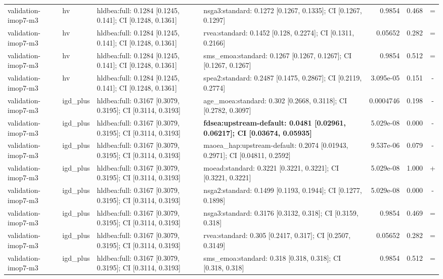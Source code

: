 \begin{tabular}{llllrrc}
validation-imop7-m3 & hv & hldbea:full: 0.1284 [0.1245, 0.141]; CI [0.1248, 0.1361] & nsga3:standard: 0.1272 [0.1267, 0.1335]; CI [0.1267, 0.1297] & 0.9854 & 0.468 & = \\
validation-imop7-m3 & hv & hldbea:full: 0.1284 [0.1245, 0.141]; CI [0.1248, 0.1361] & rvea:standard: 0.1452 [0.128, 0.2274]; CI [0.1311, 0.2166] & 0.05652 & 0.282 & = \\
validation-imop7-m3 & hv & hldbea:full: 0.1284 [0.1245, 0.141]; CI [0.1248, 0.1361] & sms\_emoa:standard: 0.1267 [0.1267, 0.1267]; CI [0.1267, 0.1267] & 0.9854 & 0.512 & = \\
validation-imop7-m3 & hv & hldbea:full: 0.1284 [0.1245, 0.141]; CI [0.1248, 0.1361] & spea2:standard: 0.2487 [0.1475, 0.2867]; CI [0.2119, 0.2774] & 3.095e-05 & 0.151 & - \\
validation-imop7-m3 & igd\_plus & hldbea:full: 0.3167 [0.3079, 0.3195]; CI [0.3114, 0.3193] & age\_moea:standard: 0.302 [0.2668, 0.3118]; CI [0.2782, 0.3097] & 0.0004746 & 0.198 & - \\
validation-imop7-m3 & igd\_plus & hldbea:full: 0.3167 [0.3079, 0.3195]; CI [0.3114, 0.3193] & \textbf{fdsea:upstream-default: 0.0481 [0.02961, 0.06217]; CI [0.03674, 0.05935]} & 5.029e-08 & 0.000 & - \\
validation-imop7-m3 & igd\_plus & hldbea:full: 0.3167 [0.3079, 0.3195]; CI [0.3114, 0.3193] & maoea\_hap:upstream-default: 0.2074 [0.01943, 0.2971]; CI [0.04811, 0.2592] & 9.537e-06 & 0.079 & - \\
validation-imop7-m3 & igd\_plus & hldbea:full: 0.3167 [0.3079, 0.3195]; CI [0.3114, 0.3193] & moead:standard: 0.3221 [0.3221, 0.3221]; CI [0.3221, 0.3221] & 5.029e-08 & 1.000 & + \\
validation-imop7-m3 & igd\_plus & hldbea:full: 0.3167 [0.3079, 0.3195]; CI [0.3114, 0.3193] & nsga2:standard: 0.1499 [0.1193, 0.1944]; CI [0.1277, 0.1898] & 5.029e-08 & 0.000 & - \\
validation-imop7-m3 & igd\_plus & hldbea:full: 0.3167 [0.3079, 0.3195]; CI [0.3114, 0.3193] & nsga3:standard: 0.3176 [0.3132, 0.318]; CI [0.3159, 0.318] & 0.9854 & 0.469 & = \\
validation-imop7-m3 & igd\_plus & hldbea:full: 0.3167 [0.3079, 0.3195]; CI [0.3114, 0.3193] & rvea:standard: 0.305 [0.2417, 0.317]; CI [0.2507, 0.3149] & 0.05652 & 0.282 & = \\
validation-imop7-m3 & igd\_plus & hldbea:full: 0.3167 [0.3079, 0.3195]; CI [0.3114, 0.3193] & sms\_emoa:standard: 0.318 [0.318, 0.318]; CI [0.318, 0.318] & 0.9854 & 0.512 & = \\

\end{tabular}
